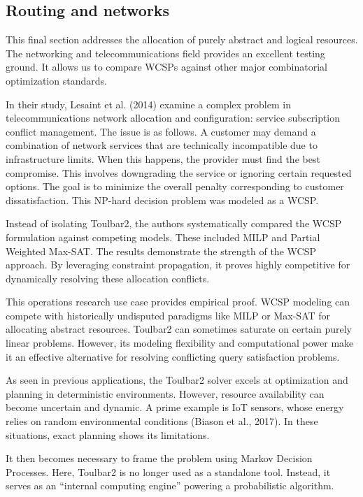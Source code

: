 \documentclass[runningheads]{llncs}
\begin{document}
\subsection{Routing and networks}

This final section addresses the allocation of purely abstract and logical resources. The networking and telecommunications field provides an excellent testing ground. It allows us to compare \acp{WCSP} against other major combinatorial optimization standards.

In their study, Lesaint et al. (2014)\cite{lesaint2014developing} examine a complex problem in telecommunications network allocation and configuration: service subscription conflict management. The issue is as follows. A customer may demand a combination of network services that are technically incompatible due to infrastructure limits. 
When this happens, the provider must find the best compromise. This involves downgrading the service or ignoring certain requested options. The goal is to minimize the overall penalty corresponding to customer dissatisfaction.
This NP-hard decision problem was modeled as a \ac{WCSP}.

Instead of isolating Toulbar2, the authors systematically compared the \ac{WCSP} formulation against competing models. These included \ac{MILP} and Partial Weighted Max-SAT. 
The results demonstrate the strength of the \ac{WCSP} approach. By leveraging constraint propagation, it proves highly competitive for dynamically resolving these allocation conflicts.

This operations research use case provides empirical proof. \ac{WCSP} modeling can compete with historically undisputed paradigms like \ac{MILP} or Max-SAT for allocating abstract resources. 
Toulbar2 can sometimes saturate on certain purely linear problems. However, its modeling flexibility and computational power make it an effective alternative for resolving conflicting query satisfaction problems.
\medskip{}


As seen in previous applications, the Toulbar2 solver excels at optimization and planning in deterministic environments. However, resource availability can become uncertain and dynamic. 
A prime example is IoT sensors, whose energy relies on random environmental conditions (Biason et al., 2017)\cite{ieee_transactions_on_mobile_computing}. In these situations, exact planning shows its limitations. 

It then becomes necessary to frame the problem using Markov Decision Processes. Here, Toulbar2 is no longer used as a standalone tool. Instead, it serves as an ``internal computing engine'' powering a probabilistic algorithm.
\end{document}
